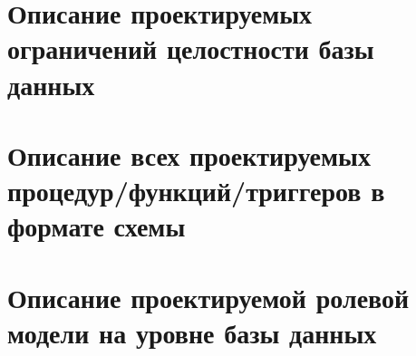 \section{Описание проектируемых ограничений целостности базы данных}
\section{Описание всех проектируемых процедур/функций/триггеров в формате схемы}
\section{Описание проектируемой ролевой модели на уровне базы данных}